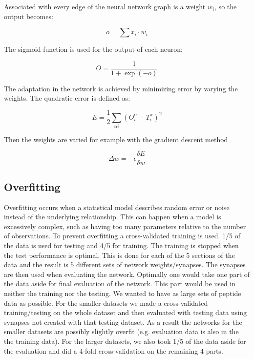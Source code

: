Associated with every edge of the neural network graph is a weight $w_i$, so the output becomes:

\begin{equation}
o = \sum{x_i \cdot w_i}
\end{equation}

The sigmoid function is used for the output of each neuron:

\begin{equation}
O = \frac{1}{1+\exp{(-o)}}
\end{equation}

The adaptation in the network is achieved by minimizing error by varying the weights. The quadratic error is defined as:

\begin{equation}
E = \frac{1}{2}\sum_{\alpha i}{(O_i^\alpha - T_i^\alpha)^2}
\end{equation}

Then the weights are varied for example with the gradient descent method

\begin{equation}
\Delta w = -\epsilon \frac{\delta E}{\delta w}
\end{equation}

\subsection*{Overfitting}
Overfitting occurs when a statistical model describes random error or noise instead of the underlying relationship.
This can happen when a model is excessively complex, such as having too many parameters relative to the number of observations.
To prevent overfitting a cross-validated training is used. 1/5 of the data is used for testing and 4/5 for training. 
The training is stopped when the test performance is optimal. This is done for each of the 5 sections of the data and the result is 5 different sets of network weights/synapses.
The synapses are then used when evaluating the network.
Optimally one would take one part of the data aside for final evaluation of the network. This part would be used in neither the training nor the testing.
We wanted to have as large sets of peptide data as possible. 
For the smaller datasets we made a cross-validated training/testing on the whole dataset and then evaluated with testing data using synapses not created with that testing dataset.
As a result the networks for the smaller datasets are possibly slightly overfit (e.g. evaluation data is also in the the training data).
For the larger datasets, we also took 1/5 of the data aside for the evaluation and did a 4-fold cross-validation on the remaining 4 parts.

